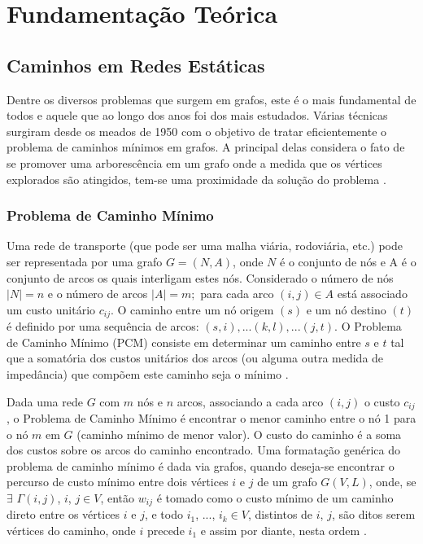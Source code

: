 \chapter{Fundamentação Teórica}

\section{Caminhos em Redes Estáticas}
Dentre os diversos problemas que surgem em grafos, este é o mais fundamental de todos e
aquele que ao longo dos anos foi dos mais estudados. Várias técnicas surgiram desde os meados
de 1950 com o objetivo de tratar eficientemente o problema de caminhos mínimos em grafos. A
principal delas considera o fato de se promover uma arborescência em um grafo onde a medida
que os vértices explorados são atingidos, tem-se uma proximidade da solução do problema \cite{negreirosbook}.

\subsection{Problema de Caminho Mínimo}
Uma rede de transporte (que pode ser uma malha viária, rodoviária, etc.) pode ser
representada por uma grafo $G = (N, A)$, onde $N$ é o conjunto de nós e A é o conjunto de arcos
os quais interligam estes nós. Considerado o número de nós $|N| = n$ e o número de arcos $|A| = m;$ para
cada arco $(i, j) \in A$ está associado um custo unitário $c_{ij}$. O caminho entre um
nó origem $(s)$ e um nó destino $(t)$ é definido por uma sequência de
arcos: $(s,i),...(k,l),...(j,t)$. O Problema de Caminho Mínimo (PCM) consiste em determinar
um caminho entre $s$ e $t$ tal que a somatória dos custos unitários dos arcos (ou alguma
outra medida de impedância) que compõem este caminho seja o mínimo \cite{cunha}.

Dada uma rede $G$ com $m$ nós e $n$ arcos, associando a cada arco $(i,j)$ o custo $c_{ij}$, o Problema
de Caminho Mínimo é encontrar o menor caminho entre o nó 1 para o nó $m$ em $G$ (caminho mínimo de menor valor).
O custo do caminho é a soma dos custos sobre os arcos do caminho encontrado. Uma formatação genérica do problema
de caminho mínimo é dada via grafos, quando deseja-se encontrar o percurso de custo mínimo entre dois vértices $i$ e $j$
de um grafo $G(V,L)$, onde, se $\exists$ $\Gamma (i,j)$, $i$, $j \in V$, então $w_{ij}$ é tomado como o custo mínimo
de um caminho direto entre os vértices $i$ e $j$, e todo $i_1$, ..., $i_k \in V$, distintos de $i$, $j$, são ditos
serem vértices do caminho, onde $i$ precede $i_1$ e assim por diante, nesta ordem \cite{negreirosbook}.

